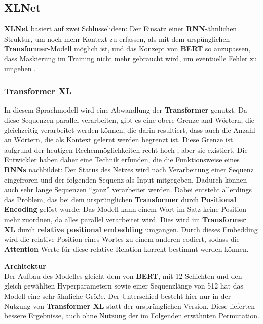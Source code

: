 \subsection{XLNet}
\textbf{XLNet} basiert auf zwei Schl\"usselideen: Der Einsatz einer \textbf{RNN}-\"ahnlichen Struktur, um noch mehr Kontext zu erfassen, als mit dem ursp\"unglichen \textbf{Transformer}-Modell m\"oglich ist, und das Konzept von \textbf{BERT} so anzupassen, dass Maskierung im Training nicht mehr gebraucht wird, um eventuelle Fehler zu umgehen \cite{xlnetex}.

\subsubsection*{Transformer XL}
In diesem Sprachmodell wird eine Abwandlung der \textbf{Transformer} genutzt. Da diese Sequenzen parallel verarbeiten, gibt es eine obere Grenze and W\"ortern, die gleichzeitig verarbeitet werden k\"onnen, die darin resultiert, dass auch die Anzahl an W\"ortern, die als Kontext gelernt werden begrenzt ist. Diese Grenze ist aufgrund der heutigen Rechenm\"oglichkeiten recht hoch \cite{xlnetex}, aber sie existiert. Die Entwickler haben daher eine Technik erfunden, die die Funktionsweise eines \textbf{RNNs} nachbildet: Der Status des Netzes wird nach Verarbeitung einer Sequenz eingefroren und der folgenden Sequenz als Input mitgegeben. Dadurch k\"onnen auch sehr lange Sequenzen "`ganz"' verarbeitet werden. Dabei entsteht allerdings das Problem, das bei dem urspr\"unglichen \textbf{Transformer} durch \textbf{Positional Encoding} gel\"ost wurde: Das Modell kann einem Wort im Satz keine Position mehr zuordnen, da alles parallel verarbeitet wird. Dies wird im \textbf{Transformer XL} durch \textbf{relative positional embedding} umgangen. Durch dieses Embedding wird die relative Position eines Wortes zu einem anderen codiert, sodass die \textbf{Attention}-Werte f\"ur diese relative Relation korrekt bestimmt werden k\"onnen.

\textbf{Architektur}\\
Der Aufbau des Modelles gleicht dem von \textbf{BERT}, mit 12 Schichten und den gleich gew\"ahlten Hyperparametern sowie einer Sequenzl\"ange von 512 hat das Modell eine sehr \"ahnliche Gr\"o{\ss}e. Der Unterschied besteht hier nur in der Nutzung von \textbf{Transformer XL} statt der urspr\"unglichen Version. Diese lieferten bessere Ergebnisse, auch ohne Nutzung der im Folgenden erw\"ahnten Permutation.


